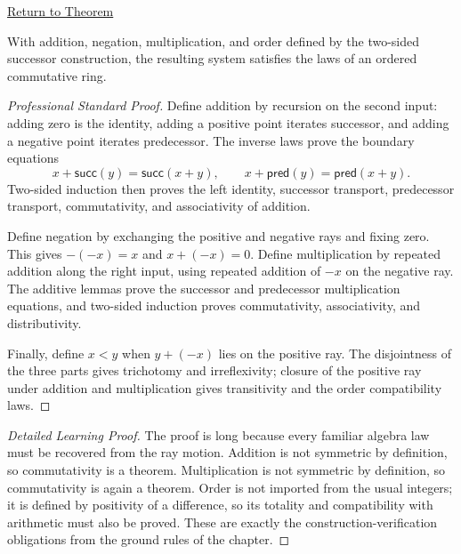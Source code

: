 \newpage
{}
\label{prf:two-sided-integers-ordered-commutative-ring}

\begin{remark*}[Return]
\hyperref[thm:two-sided-integers-ordered-commutative-ring]{Return to Theorem}
\end{remark*}

\begin{theorem*}
With addition, negation, multiplication, and order defined by the two-sided
successor construction, the resulting system satisfies the laws of an ordered
commutative ring.
\end{theorem*}

\begin{proof}[Professional Standard Proof]
\LRAProofBodyStart
Define addition by recursion on the second input: adding zero is the identity,
adding a positive point iterates successor, and adding a negative point
iterates predecessor. The inverse laws prove the boundary equations
\[
x+\mathsf{succ}(y)=\mathsf{succ}(x+y),
\qquad
x+\mathsf{pred}(y)=\mathsf{pred}(x+y).
\]
Two-sided induction then proves the left identity, successor transport,
predecessor transport, commutativity, and associativity of addition.

Define negation by exchanging the positive and negative rays and fixing zero.
This gives \(-(-x)=x\) and \(x+(-x)=0\). Define multiplication by repeated
addition along the right input, using repeated addition of \(-x\) on the
negative ray. The additive lemmas prove the successor and predecessor
multiplication equations, and two-sided induction proves commutativity,
associativity, and distributivity.

Finally, define \(x<y\) when \(y+(-x)\) lies on the positive ray. The
disjointness of the three parts gives trichotomy and irreflexivity; closure of
the positive ray under addition and multiplication gives transitivity and the
order compatibility laws.
\end{proof}

\begin{proof}[Detailed Learning Proof]
\LRAProofBodyStart
The proof is long because every familiar algebra law must be recovered from
the ray motion. Addition is not symmetric by definition, so commutativity is a
theorem. Multiplication is not symmetric by definition, so commutativity is
again a theorem. Order is not imported from the usual integers; it is defined
by positivity of a difference, so its totality and compatibility with
arithmetic must also be proved. These are exactly the construction-verification
obligations from the ground rules of the chapter.
\end{proof}

